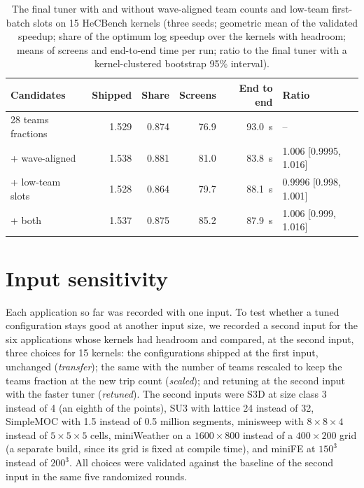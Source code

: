 \documentclass[10pt]{article}
\begin{document}
\begin{table}[t]
\centering
\caption{The final tuner with and without wave-aligned team counts and
low-team first-batch slots on 15 HeCBench kernels (three seeds; geometric mean
of the validated speedup; share of the optimum log speedup over the kernels
with headroom; means of screens and end-to-end time per run; ratio to the
final tuner with a kernel-clustered bootstrap 95\% interval).}
\label{tab:wave}
\small
\begin{tabular}{lrrrrl}
\toprule
Candidates & Shipped & Share & Screens & End to end & Ratio \\
\midrule
28 teams fractions & 1.529 & 0.874 & 76.9 & 93.0~s & -- \\
+ wave-aligned & 1.538 & 0.881 & 81.0 & 83.8~s & 1.006 [0.9995, 1.016] \\
+ low-team slots & 1.528 & 0.864 & 79.7 & 88.1~s & 0.9996 [0.998, 1.001] \\
+ both & 1.537 & 0.875 & 85.2 & 87.9~s & 1.006 [0.999, 1.016] \\
\bottomrule
\end{tabular}
\end{table}

\section{Input sensitivity}
\label{sec:inputs}
Each application so far was recorded with one input. To test whether a tuned
configuration stays good at another input size, we recorded a second input for
the six applications whose kernels had headroom and compared, at the second
input, three choices for 15 kernels: the configurations shipped at the first
input, unchanged (\emph{transfer}); the same with the number of teams rescaled
to keep the teams fraction at the new trip count (\emph{scaled}); and retuning
at the second input with the faster tuner (\emph{retuned}). The second inputs
were S3D at size class 3 instead of 4 (an eighth of the points), SU3 with lattice
24 instead of 32, SimpleMOC with 1.5 instead of 0.5 million segments, minisweep
with $8\times 8\times 4$ instead of $5\times 5\times 5$ cells, miniWeather on a
$1600\times 800$ instead of a $400\times 200$ grid (a separate build, since its
grid is fixed at compile time), and miniFE at $150^3$ instead of $200^3$. All
choices were validated against the baseline of the second input in the same five
randomized rounds.
\end{document}

